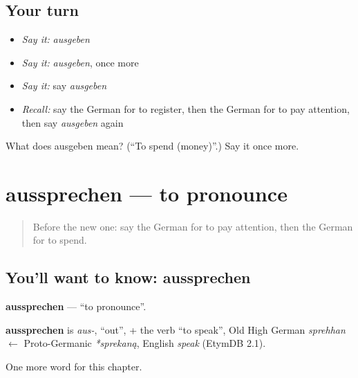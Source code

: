 \subsection*{Your turn}
\begin{itemize}
\raggedright
  \item \emph{Say it:} \emph{ausgeben}
  \item \emph{Say it:} \emph{ausgeben}, once more
  \item \emph{Say it:} say \emph{ausgeben}
  \item \emph{Recall:} say the German for to register, then the German for to pay attention, then say \emph{ausgeben} again
\end{itemize}

\begin{tcolorbox}[breakable,colback=teal!4,colframe=teal!35!black,title={Before you move on}]
What does ausgeben mean? (\textquotedblleft{}To spend (money)\textquotedblright{}.) Say it once more.
\end{tcolorbox}
\section[aussprechen]{aussprechen — to pronounce}

\label{lesson:GE-C245-aussprechen}



\begin{quote}
Before the new one: say the German for to pay attention, then the German for to spend.
\end{quote}

\subsection*{You'll want to know: aussprechen}
\textbf{aussprechen} — \textquotedblleft{}to pronounce\textquotedblright{}.

\begin{cousinweb}
\textbf{aussprechen} is \emph{aus-}, \textquotedblleft{}out\textquotedblright{}, + the verb \textquotedblleft{}to speak\textquotedblright{}, Old High German \emph{sprehhan} $\leftarrow$ Proto-Germanic \emph{*sprekaną}, English \emph{speak} (EtymDB 2.1).
\end{cousinweb}

\begin{grammarlens}[title={What you've built}]
One more word for this chapter.
\end{grammarlens}

